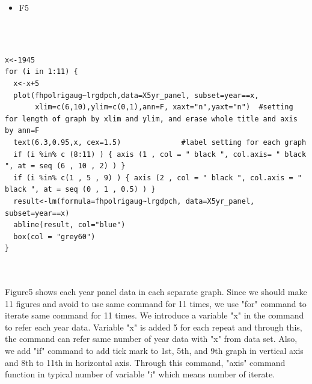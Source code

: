 \documentclass[a4paper,11pt]{article}
\begin{document}
\begin{itemize}
 \item F5
\end{itemize}
\\
\\

\begin{lstlisting}
x<-1945
for (i in 1:11) {
  x<-x+5
  plot(fhpolrigaug~lrgdpch,data=X5yr_panel, subset=year==x,
       xlim=c(6,10),ylim=c(0,1),ann=F, xaxt="n",yaxt="n")  #setting for length of graph by xlim and ylim, and erase whole title and axis by ann=F
  text(6.3,0.95,x, cex=1.5)              #label setting for each graph
  if (i %in% c (8:11) ) { axis (1 , col = " black ", col.axis= " black ", at = seq (6 , 10 , 2) ) }
  if (i %in% c(1 , 5 , 9) ) { axis (2 , col = " black ", col.axis = " black ", at = seq (0 , 1 , 0.5) ) }
  result<-lm(formula=fhpolrigaug~lrgdpch, data=X5yr_panel, subset=year==x)
  abline(result, col="blue")
  box(col = "grey60")
}
\end{lstlisting}

\\

\\

Figure5 shows each year panel data in each separate graph. Since we should make 11 figures and avoid to use same command for 11 times, we use "for" command to iterate same command for 11 times. We introduce a variable "x" in the command to refer each year data.  Variable "x" is added 5 for each repeat and through this, the command can refer same number of year data with "x" from data set. Also, we add "if" command to add tick mark to 1st, 5th, and 9th graph in vertical axis and 8th to 11th in horizontal axis. Through this command, "axis" command function in typical number of variable "i" which means number of iterate.
\end{document}
